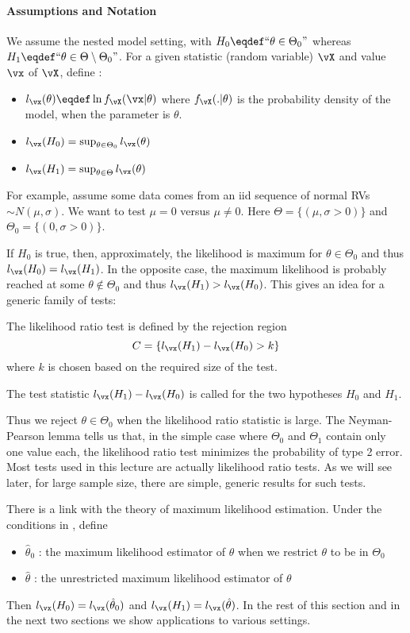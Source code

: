 \paragraph{Assumptions and Notation}
We assume the nested model setting, with  $H_0 \eqdef ``\theta
\in \Theta_0 "$ whereas $H_1 \eqdef ``\theta \in \Theta
\setminus \Theta_0 "$. For a given statistic (random variable)
${\vX}$ and value ${\vx}$ of ${\vX}$, define :

\begin{itemize}
  \item $l_{\vx}(\theta) \eqdef \ln f_{\vX}({\vx}|\theta)$
      where $f_{\vX}(.|\theta)$ is the probability density
      of the model, when the parameter is $\theta$.
  \item $l_{\vx}(H_0)=\sup_{\theta \in \Theta_0
      }l_{\vx}(\theta)$
   \item $l_{\vx}(H_1)=\sup_{\theta \in \Theta
       }l_{\vx}(\theta)$
\end{itemize}


For example, assume some data comes from an iid sequence of
normal RVs $\sim N(\mu,\sigma)$. We want to test $\mu=0$
versus $\mu \neq 0$. Here $\Theta=\{(\mu,\sigma>0)\}$ and
$\Theta_0=\{(0,\sigma>0)\}$.

If $H_0$ is true, then, approximately, the likelihood is
maximum for $\theta \in \Theta_0$ and thus
$l_{\vx}(H_0)=l_{\vx}(H_1)$. In the opposite case, the maximum
likelihood is probably reached at some $\theta \nin \Theta_0$
and thus $l_{\vx}(H_1)>l_{\vx}(H_0)$. This gives an idea for a
generic family of tests:
\begin{definition}
  The likelihood ratio test is defined by the
 rejection region
$$C = \left\{l_{\vx}(H_1)-l_{\vx}(H_0) >k\right\}$$
where $k$ is chosen based on the required size of the test.
\end{definition}
The test statistic $l_{\vx}(H_1)-l_{\vx}(H_0)$ is called
 for the two hypotheses $H_0$ and $H_1$.

Thus we reject $\theta \in \Theta_0$ when the likelihood ratio
statistic is large. The Neyman-Pearson lemma \cite[Section
6.3]{weber-c11} tells us that, in the simple case where
$\Theta_0$ and $\Theta_1$ contain only one value each, the
likelihood ratio test minimizes the probability of type 2
error. Most tests used in this lecture are actually likelihood
ratio tests. As we will see later, for large sample size, there
are simple, generic results for such tests.

There is a link with the theory of maximum likelihood estimation.
Under the conditions in , define
\begin{itemize}
  \item $\hat{\theta}_0$ : the maximum likelihood estimator
      of $\theta$ when we restrict $\theta$ to be in
      $\Theta_0$
  \item $\hat{\theta}$ : the unrestricted maximum
      likelihood estimator of $\theta$
\end{itemize}
Then $l_{\vx}(H_0)=l_{\vx}(\hat{\theta}_0)$ and
$l_{\vx}(H_1)=l_{\vx}(\hat{\theta})$. In the rest of this
section and in the next two sections we show applications to
various settings.

